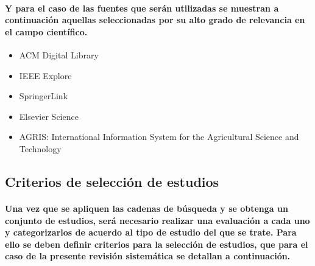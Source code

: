\documentclass[10pt, twocolumn]{article}
\begin{document}
\paragraph{Y para el caso de las fuentes que serán utilizadas se muestran a continuación aquellas seleccionadas por su alto grado de relevancia en el campo científico.}
\begin{itemize}
	\item{ACM Digital Library}
	\item{IEEE Explore}
	\item{SpringerLink}
	\item{Elsevier Science}
	\item{AGRIS: International Information System for the Agricultural Science and Technology}
\end{itemize}

\subsection{Criterios de selección de estudios}
\paragraph{Una vez que se apliquen las cadenas de búsqueda y se obtenga un conjunto de estudios, será necesario realizar una evaluación a cada uno y categorizarlos de acuerdo al tipo de estudio del que se trate. Para ello se deben definir criterios para la selección de estudios, que para el caso de la presente revisión sistemática se detallan a continuación.}
\end{document}
